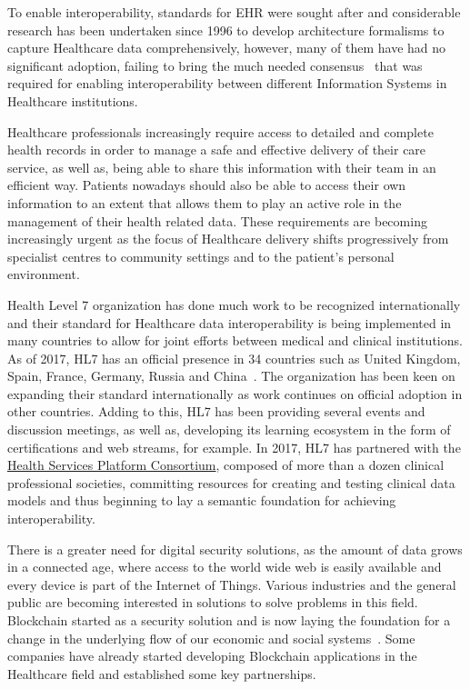 To enable interoperability, standards for EHR were sought after and
considerable research has been undertaken since 1996 to develop architecture
formalisms to capture Healthcare data comprehensively, however, many of them
have had no significant adoption, failing to bring the much needed
consensus~\cite{Eichelberg2006} that was required for enabling interoperability
between different Information Systems in Healthcare institutions. 

Healthcare professionals increasingly require access to detailed and complete
health records in order to manage a safe and effective delivery of their care
service, as well as, being able to share this information with their team in an
efficient way. Patients nowadays should also be able to access their own
information to an extent that allows them to play an active role in the
management of their health related data. These requirements are becoming
increasingly urgent as the focus of Healthcare delivery shifts progressively
from specialist centres to community settings and to the patient’s personal
environment.

Health Level 7 organization has done much work to be recognized internationally
and their standard for Healthcare data interoperability is being implemented in
many countries to allow for joint efforts between medical and clinical
institutions.  As of 2017, HL7 has an official presence in 34 countries such as
United Kingdom, Spain, France, Germany, Russia and China~\cite{HL7Anual2016}.
The organization has been keen on expanding their standard internationally as
work continues on official adoption in other countries. Adding to this, HL7 has
been providing several events and discussion meetings, as well as, developing
its learning ecosystem in the form of certifications and web streams, for
example. In 2017, HL7 has partnered with the
\href{https://www.hspconsortium.org/}{Health Services Platform Consortium},
composed of more than a dozen clinical professional societies, committing
resources for creating and testing clinical data models and thus beginning to
lay a semantic foundation for achieving interoperability.

There is a greater need for digital security solutions, as the amount of data
grows in a connected age, where access to the world wide web is easily
available and every device is part of the Internet of Things. Various
industries and the general public are becoming interested in solutions to solve
problems in this field. Blockchain started as a security solution and is now
laying the foundation for a change in the underlying flow of our economic and
social systems~\cite{Zago2018,Marr2018,Long2018}. Some companies have already
started developing Blockchain applications in the Healthcare field and
established some key partnerships.


